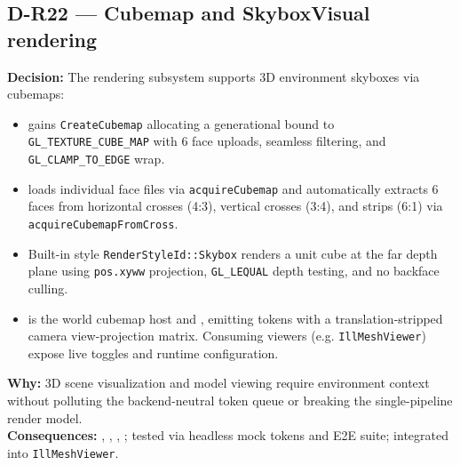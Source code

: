 \subsection*{D-R22 --- Cubemap and SkyboxVisual rendering}
\begin{decisionbox}[title={D-R22 \quad 2026-09-04}]
\textbf{Decision:} The rendering subsystem supports 3D environment skyboxes via
cubemaps:
\begin{itemize}
  \item {} gains \texttt{CreateCubemap} allocating a
        generational  bound to
        \texttt{GL\_TEXTURE\_CUBE\_MAP} with 6 face uploads, seamless filtering,
        and \texttt{GL\_CLAMP\_TO\_EDGE} wrap.
  \item {} loads individual face files via
        \texttt{acquireCubemap} and automatically extracts 6 faces from horizontal
        crosses (4:3), vertical crosses (3:4), and strips (6:1) via
        \texttt{acquireCubemapFromCross}.
  \item Built-in style \texttt{RenderStyleId::Skybox} renders a unit cube
        at the far depth plane using \texttt{pos.xyww} projection,
        \texttt{GL\_LEQUAL} depth testing, and no backface culling.
  \item {} is the world cubemap host and
        , emitting tokens with a
        translation-stripped camera view-projection matrix. Consuming
        viewers (e.g. \texttt{IllMeshViewer}) expose live toggles and runtime
        configuration.
\end{itemize}
\textbf{Why:} 3D scene visualization and model viewing require environment
context without polluting the backend-neutral token queue or breaking the
single-pipeline render model.\\
\textbf{Consequences:} , ,
, ; tested via headless mock tokens
and E2E suite; integrated into \texttt{IllMeshViewer}.
\end{decisionbox}

